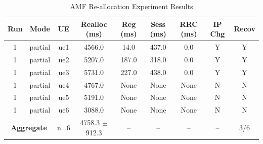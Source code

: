 \begin{table}[ht]
\centering
\begin{tabular}{|c|c|c|c|c|c|c|c|c|}
\hline
Run & Mode & UE & Realloc (ms) & Reg (ms) & Sess (ms) & RRC (ms) & IP Chg & Recov \\
\hline
1 & partial & ue1 & 4566.0 & 14.0 & 437.0 & 0.0 & Y & Y \\
1 & partial & ue2 & 5207.0 & 187.0 & 318.0 & 0.0 & Y & Y \\
1 & partial & ue3 & 5731.0 & 227.0 & 438.0 & 0.0 & Y & Y \\
1 & partial & ue4 & 4767.0 & None & None & None & N & N \\
1 & partial & ue5 & 5191.0 & None & None & None & N & N \\
1 & partial & ue6 & 3088.0 & None & None & None & N & N \\
\multicolumn{2}{|c|}{\textbf{Aggregate}} & n=6 & 4758.3 $\pm$ 912.3 & -- & -- & -- & -- & 3/6 \\
\hline
\end{tabular}
\caption{AMF Re-allocation Experiment Results}
\label{tab:amf_realloc}
\end{table}
